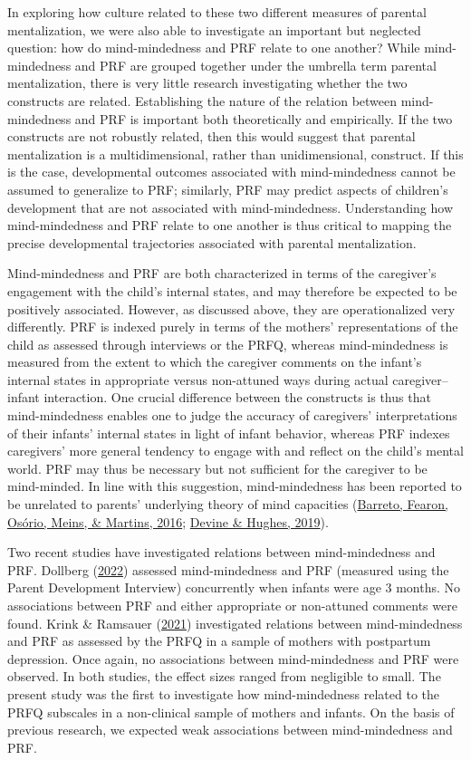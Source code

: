 \documentclass[
]{article}
\begin{document}
In exploring how culture related to these two different measures of parental mentalization, we were also able to investigate an important but neglected question: how do mind-mindedness and PRF relate to one another? While mind-mindedness and PRF are grouped together under the umbrella term parental mentalization, there is very little research investigating whether the two constructs are related. Establishing the nature of the relation between mind-mindedness and PRF is important both theoretically and empirically. If the two constructs are not robustly related, then this would suggest that parental mentalization is a multidimensional, rather than unidimensional, construct. If this is the case, developmental outcomes associated with mind-mindedness cannot be assumed to generalize to PRF; similarly, PRF may predict aspects of children's development that are not associated with mind-mindedness. Understanding how mind-mindedness and PRF relate to one another is thus critical to mapping the precise developmental trajectories associated with parental mentalization.

Mind-mindedness and PRF are both characterized in terms of the caregiver's engagement with the child's internal states, and may therefore be expected to be positively associated. However, as discussed above, they are operationalized very differently. PRF is indexed purely in terms of the mothers' representations of the child as assessed through interviews or the PRFQ, whereas mind-mindedness is measured from the extent to which the caregiver comments on the infant's internal states in appropriate versus non-attuned ways during actual caregiver--infant interaction. One crucial difference between the constructs is thus that mind-mindedness enables one to judge the accuracy of caregivers' interpretations of their infants' internal states in light of infant behavior, whereas PRF indexes caregivers' more general tendency to engage with and reflect on the child's mental world. PRF may thus be necessary but not sufficient for the caregiver to be mind-minded. In line with this suggestion, mind-mindedness has been reported to be unrelated to parents' underlying theory of mind capacities (\protect\hyperlink{ref-Barreto2016}{Barreto, Fearon, Osório, Meins, \& Martins, 2016}; \protect\hyperlink{ref-Devine2019}{Devine \& Hughes, 2019}).

Two recent studies have investigated relations between mind-mindedness and PRF. Dollberg (\protect\hyperlink{ref-Dollberg2022}{2022}) assessed mind-mindedness and PRF (measured using the Parent Development Interview) concurrently when infants were age 3 months. No associations between PRF and either appropriate or non-attuned comments were found. Krink \& Ramsauer (\protect\hyperlink{ref-Krink2021}{2021}) investigated relations between mind-mindedness and PRF as assessed by the PRFQ in a sample of mothers with postpartum depression. Once again, no associations between mind-mindedness and PRF were observed. In both studies, the effect sizes ranged from negligible to small. The present study was the first to investigate how mind-mindedness related to the PRFQ subscales in a non-clinical sample of mothers and infants. On the basis of previous research, we expected weak associations between mind-mindedness and PRF.
\end{document}
